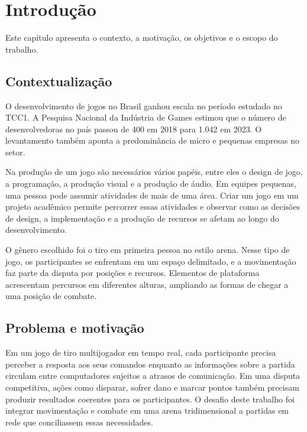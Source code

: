 \chapter{Introdução}\label{cap:tcc2-1}

Este capítulo apresenta o contexto, a motivação, os objetivos e o escopo do trabalho.

\section{Contextualização}\label{sec:1.1}

O desenvolvimento de jogos no Brasil ganhou escala no período estudado no TCC1. A Pesquisa Nacional da Indústria de Games estimou que o número de desenvolvedoras no país passou de 400 em 2018 para 1.042 em 2023. O levantamento também aponta a predominância de micro e pequenas empresas no setor. \cite{ABRAGAMES-2023}

Na produção de um jogo são necessários vários papéis, entre eles o design de jogo, a programação, a produção visual e a produção de áudio. Em equipes pequenas, uma pessoa pode assumir atividades de mais de uma área. Criar um jogo em um projeto acadêmico permite percorrer essas atividades e observar como as decisões de design, a implementação e a produção de recursos se afetam ao longo do desenvolvimento.

O gênero escolhido foi o tiro em primeira pessoa no estilo arena. Nesse tipo de jogo, os participantes se enfrentam em um espaço delimitado, e a movimentação faz parte da disputa por posições e recursos. Elementos de plataforma acrescentam percursos em diferentes alturas, ampliando as formas de chegar a uma posição de combate.

\section{Problema e motivação}\label{sec:1.2}

Em um jogo de tiro multijogador em tempo real, cada participante precisa perceber a resposta aos seus comandos enquanto as informações sobre a partida circulam entre computadores sujeitos a atrasos de comunicação. Em uma disputa competitiva, ações como disparar, sofrer dano e marcar pontos também precisam produzir resultados coerentes para os participantes. O desafio deste trabalho foi integrar movimentação e combate em uma arena tridimensional a partidas em rede que conciliassem essas necessidades. \cite{FIEDLER-REDE}


